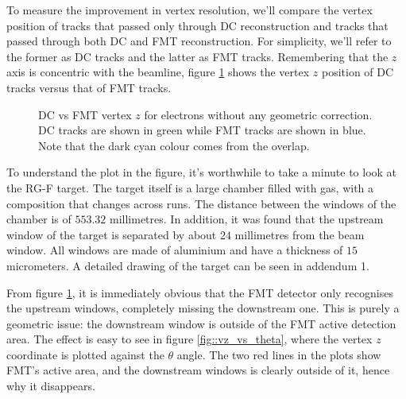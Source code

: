     To measure the improvement in vertex resolution, we'll compare the vertex position of tracks that passed only through DC reconstruction and tracks that passed through both DC and FMT reconstruction.
    For simplicity, we'll refer to the former as DC tracks and the latter as FMT tracks.
    Remembering that the $z$ axis is concentric with the beamline, figure \ref{fig::dc_vs_fmt_vz_011983} shows the vertex $z$ position of DC tracks versus that of FMT tracks.

    \begin{figure}[h!]
        \centering{}
        \caption[DC vs FMT $z$ without geometric correction]{DC vs FMT vertex $z$ for electrons without any geometric correction. DC tracks are shown in green while FMT tracks are shown in blue. Note that the dark cyan colour comes from the overlap.}
        \label{fig::dc_vs_fmt_vz_011983}
    \end{figure}

    To understand the plot in the figure, it's worthwhile to take a minute to look at the RG-F target.
    The target itself is a large chamber filled with gas, with a composition that changes across runs.
    The distance between the windows of the chamber is of $553.32$ millimetres.
    In addition, it was found that the upstream window of the target is separated by about $24$ millimetres from the beam window.
    All windows are made of aluminium and have a thickness of $15$ micrometers. %
    A detailed drawing of the target can be seen in addendum 1.

    From figure \ref{fig::dc_vs_fmt_vz_011983}, it is immediately obvious that the FMT detector only recognises the upstream windows, completely missing the downstream one.
    This is purely a geometric issue:
    the downstream window is outside of the FMT active detection area.
    The effect is easy to see in figure \ref{fig::vz_vs_theta}, where the vertex $z$ coordinate is plotted against the $\theta$ angle.
    The two red lines in the plots show FMT's active area, and the downstream windows is clearly outside of it, hence why it disappears.


